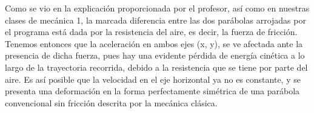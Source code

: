 \documentclass[12pt]{article}
\begin{document}
 Como se vio en la explicación proporcionada por el profesor, así como en nuestras clases de mecánica 1, la marcada diferencia entre las dos parábolas arrojadas por el programa está dada por la resistencia del aire, es decir, la fuerza de fricción.
 Tenemos entonces que la aceleración en ambos ejes (x, y), se ve afectada ante la presencia de dicha fuerza, pues hay una evidente pérdida de energía cinética a lo largo de la trayectoria recorrida, debido a la resistencia que se tiene por parte del aire.
 Es así posible que la velocidad en el eje horizontal ya no es constante, y se presenta una deformación en la forma perfectamente simétrica de una parábola convencional sin fricción descrita por la mecánica clásica.
\end{document}

